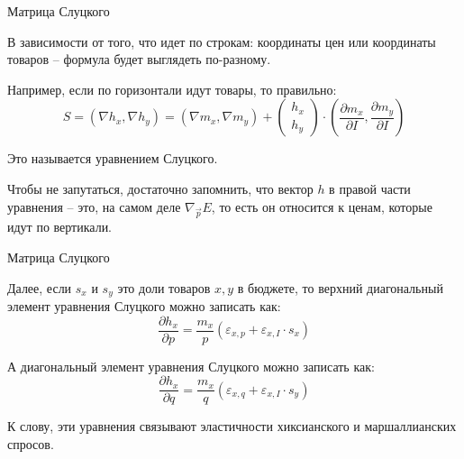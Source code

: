 \documentclass{beamer}
\begin{document}
\begin{frame}{Матрица Слуцкого}

В зависимости от того, что идет по строкам: координаты цен или координаты товаров – формула будет выглядеть по-разному. 

Например, если по горизонтали идут товары, то правильно:
$$ 
S = (\nabla h_x, \nabla h_y) = (\nabla m_x, \nabla m_y) + 
\begin{pmatrix} 
h_x \\
h_y
\end{pmatrix} 
\cdot (\frac{\partial m_x}{\partial I}, \frac{\partial m_y}{\partial I})
$$

Это называется \alert{уравнением Слуцкого}.

Чтобы не запутаться, достаточно запомнить, что вектор $h$ в правой части уравнения – это, на самом деле $\nabla_{\vec p} E$, то есть он относится к ценам, которые идут по вертикали.

\end{frame}

\begin{frame}{Матрица Слуцкого}

Далее, если $s_x$ и $s_y$ это доли товаров $x, y$ в бюджете, то верхний диагональный элемент уравнения Слуцкого можно записать как:
$$ \frac{\partial h_x}{\partial p} = \frac{m_x}{p} (\varepsilon_{x,p} + \varepsilon_{x,I} \cdot s_x)$$

А диагональный элемент уравнения Слуцкого можно записать как:
$$ \frac{\partial h_x}{\partial q} = \frac{m_x}{q} (\varepsilon_{x,q} + \varepsilon_{x,I} \cdot s_y)$$

К слову, эти уравнения связывают эластичности хиксианского и маршаллианских спросов.

\end{frame}

%
%
%
%
%
%
%
%
%
%
%
\end{document}

